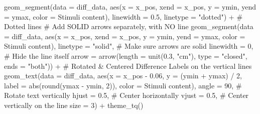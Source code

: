 \documentclass[
  bookmarksnumbered]{article}
\newenvironment{Shaded}{\begin{snugshade}}{\end{snugshade}}
\newcommand{\AttributeTok}[1]{\textcolor[rgb]{0.80,0.80,0.80}{#1}}
\newcommand{\CommentTok}[1]{\textcolor[rgb]{0.50,0.62,0.50}{#1}}
\newcommand{\DecValTok}[1]{\textcolor[rgb]{0.86,0.86,0.80}{#1}}
\newcommand{\FloatTok}[1]{\textcolor[rgb]{0.75,0.75,0.82}{#1}}
\newcommand{\FunctionTok}[1]{\textcolor[rgb]{0.94,0.94,0.56}{#1}}
\newcommand{\NormalTok}[1]{\textcolor[rgb]{0.80,0.80,0.80}{#1}}
\newcommand{\SpecialCharTok}[1]{\textcolor[rgb]{0.86,0.64,0.64}{#1}}
\newcommand{\StringTok}[1]{\textcolor[rgb]{0.80,0.58,0.58}{#1}}
\begin{document}
\begin{Shaded}
\begin{Highlighting}[]
  \FunctionTok{geom\_segment}\NormalTok{(}\AttributeTok{data =}\NormalTok{ diff\_data, }
               \FunctionTok{aes}\NormalTok{(}\AttributeTok{x =}\NormalTok{ x\_pos, }\AttributeTok{xend =}\NormalTok{ x\_pos, }
                   \AttributeTok{y =}\NormalTok{ ymin, }\AttributeTok{yend =}\NormalTok{ ymax, }
                   \AttributeTok{color =} \StringTok{\textasciigrave{}}\AttributeTok{Stimuli content}\StringTok{\textasciigrave{}}\NormalTok{),}
               \AttributeTok{linewidth =} \FloatTok{0.5}\NormalTok{,}
               \AttributeTok{linetype =} \StringTok{"dotted"}\NormalTok{) }\SpecialCharTok{+}  \CommentTok{\# Dotted lines}
  \CommentTok{\# Add SOLID arrows separately, with NO line}
  \FunctionTok{geom\_segment}\NormalTok{(}\AttributeTok{data =}\NormalTok{ diff\_data, }
               \FunctionTok{aes}\NormalTok{(}\AttributeTok{x =}\NormalTok{ x\_pos, }\AttributeTok{xend =}\NormalTok{ x\_pos, }
                   \AttributeTok{y =}\NormalTok{ ymin, }\AttributeTok{yend =}\NormalTok{ ymax, }
                   \AttributeTok{color =} \StringTok{\textasciigrave{}}\AttributeTok{Stimuli content}\StringTok{\textasciigrave{}}\NormalTok{),}
               \AttributeTok{linetype =} \StringTok{"solid"}\NormalTok{,    }\CommentTok{\# Make sure arrows are solid}
               \AttributeTok{linewidth =} \DecValTok{0}\NormalTok{,         }\CommentTok{\# Hide the line itself}
               \AttributeTok{arrow =} \FunctionTok{arrow}\NormalTok{(}\AttributeTok{length =} \FunctionTok{unit}\NormalTok{(}\FloatTok{0.3}\NormalTok{, }\StringTok{"cm"}\NormalTok{), }\AttributeTok{type =} \StringTok{"closed"}\NormalTok{, }\AttributeTok{ends =} \StringTok{"both"}\NormalTok{)) }\SpecialCharTok{+}
  \CommentTok{\# Rotated \& Centered Difference Labels on the vertical lines}
  \FunctionTok{geom\_text}\NormalTok{(}\AttributeTok{data =}\NormalTok{ diff\_data, }
            \FunctionTok{aes}\NormalTok{(}\AttributeTok{x =}\NormalTok{ x\_pos }\SpecialCharTok{{-}} \FloatTok{0.06}\NormalTok{, }\AttributeTok{y =}\NormalTok{ (ymin }\SpecialCharTok{+}\NormalTok{ ymax) }\SpecialCharTok{/} \DecValTok{2}\NormalTok{, }
                \AttributeTok{label =} \FunctionTok{abs}\NormalTok{(}\FunctionTok{round}\NormalTok{(ymax }\SpecialCharTok{{-}}\NormalTok{ ymin, }\DecValTok{2}\NormalTok{)), }
                \AttributeTok{color =} \StringTok{\textasciigrave{}}\AttributeTok{Stimuli content}\StringTok{\textasciigrave{}}\NormalTok{), }
            \AttributeTok{angle =} \DecValTok{90}\NormalTok{,        }\CommentTok{\# Rotate text vertically}
            \AttributeTok{hjust =} \FloatTok{0.5}\NormalTok{,       }\CommentTok{\# Center horizontally}
            \AttributeTok{vjust =} \FloatTok{0.5}\NormalTok{,       }\CommentTok{\# Center vertically on the line}
            \AttributeTok{size =} \DecValTok{3}\NormalTok{) }\SpecialCharTok{+}
  \FunctionTok{theme\_tq}\NormalTok{()}
\end{Highlighting}
\end{Shaded}
\end{document}
